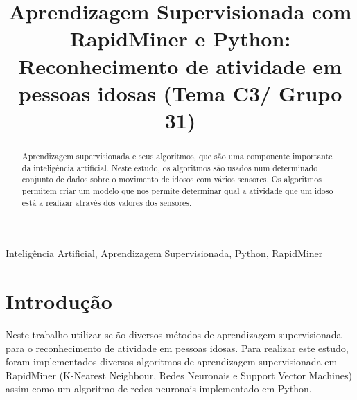 \documentclass[conference]{IEEEtran}
\begin{document}
\title{Aprendizagem Supervisionada com RapidMiner e Python: Reconhecimento de atividade em pessoas idosas (Tema C3/ Grupo 31)}

\author{
\and
{}
\and
{}
}


\maketitle

\begin{abstract}
Aprendizagem supervisionada e seus algoritmos, que são uma componente importante da inteligência artificial. Neste estudo, os algoritmos são usados num determinado conjunto de dados sobre o movimento de idosos com vários sensores. Os algoritmos permitem criar um modelo que nos permite determinar qual a atividade que um idoso está a realizar através dos valores dos sensores.
\end{abstract}

\begin{IEEEkeywords}
Inteligência Artificial, Aprendizagem Supervisionada, Python, RapidMiner
\end{IEEEkeywords}

\section{Introdução}
Neste trabalho utilizar-se-ão diversos métodos de aprendizagem supervisionada para o reconhecimento de atividade em pessoas idosas. 
Para  realizar este estudo, foram implementados diversos algoritmos de aprendizagem supervisionada em RapidMiner (K-Nearest Neighbour, Redes Neuronais e Support Vector Machines) assim como um algoritmo de redes neuronais implementado em Python.
\end{document}
